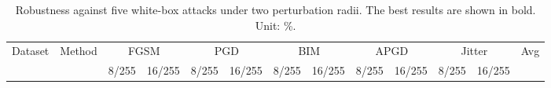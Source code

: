\documentclass[journal]{IEEEtran}
\begin{document}
\begin{table}[ht]
	\centering
	\caption{Robustness against five white-box attacks under two perturbation radii. The best results are shown in bold. Unit: \%.} 
	\label{table:attac}
	\begin{tabular}{ccccccccccccc}
		\toprule
		Dataset                  & Method               & \multicolumn{2}{c}{FGSM}        & \multicolumn{2}{c}{PGD}         & \multicolumn{2}{c}{BIM}         & \multicolumn{2}{c}{APGD}        & \multicolumn{2}{c}{Jitter}      & Avg \\
		\cmidrule(r){3-4} \cmidrule(r){5-6} \cmidrule(r){7-8} \cmidrule(r){9-10} \cmidrule(r){11-12}
		\multicolumn{1}{l}{}     & \multicolumn{1}{l}{} & 8/255          & 16/255         & 8/255          & 16/255         & 8/255          & 16/255         & 8/255          & 16/255         & 8/255          & 16/255         & \multicolumn{1}{l}{}     \\ \midrule
		

\end{tabular}
\end{table}
\end{document}
